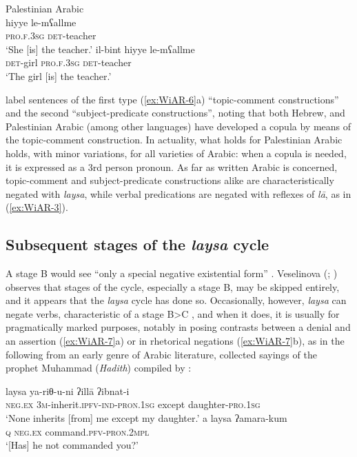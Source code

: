 \documentclass[output=paper,colorlinks,citecolor=brown]{langscibook}
\begin{document}
\ea Palestinian Arabic \citep[431]{li1977a}\label{ex:WiAR-6}\\
  \ea
  	\gll hiyye le-mʕallme\\
  	\textsc{pro.f.3sg} \textsc{det}-teacher\\
  	\glt‘She [is] the teacher.’
  \ex
  	\gll il-bint hiyye le-mʕallme\\
  	\textsc{det}-girl \textsc{pro.f.3sg} \textsc{det}-teacher\\
  	\glt ‘The girl [is] the teacher.’
\z \z

\citet[420]{li1977a} label sentences of the first type (\ref{ex:WiAR-6}a) “topic-comment constructions” and the second “subject-predicate constructions”, noting that both Hebrew, and Palestinian Arabic (among other languages) have developed a copula by means of the topic-comment construction. In actuality, what holds for Palestinian Arabic holds, with minor variations, for all varieties of Arabic: when a copula is needed, it is expressed as a 3rd person pronoun. As far as written Arabic is concerned, topic-comment and subject-predicate constructions alike are characteristically negated with \textit{laysa}, while verbal predications are negated with reflexes of \textit{lā}, as in (\ref{ex:WiAR-3}). 

\subsection{Subsequent stages of the \textit{laysa} cycle} \label{s:WiAR-2.3}

A stage B would see “only a special negative existential form” \citep[9]{Croft1991}. Veselinova (\citeyear[1338]{Veselinova2014}; \citeyear[153]{Veselinova2016}) observes that stages of the cycle, especially a stage B, may be skipped entirely, and it appears that the \textit{laysa} cycle has done so. Occasionally, however, \textit{laysa} can negate verbs, characteristic of a stage B>C \citep[9--10]{Croft1991}, and when it does, it is usually for pragmatically marked purposes, notably in posing contrasts between a denial and an assertion (\ref{ex:WiAR-7}a) or in rhetorical negations (\ref{ex:WiAR-7}b), as in the following from an early genre of Arabic literature, collected sayings of the prophet Muhammad (\textit{Hadith}) compiled by \citet[d. 870]{al-bu2000a}:

\ea \label{ex:WiAR-7}
  \ea
  	\gll laysa ya-riθ-u-ni ʔillā ʔibnat-i\\
  	\textsc{neg.ex} \textsc{3m}-inherit.\textsc{ipfv-ind-pron.1sg} except daughter-\textsc{pro.1sg}\\
  	\glt ‘None inherits [from] me except my daughter.’ \citep[Vol. VIII p. 151]{al-bu2000a}
  \ex
  	\gll a laysa ʔamara-kum\\
  	\textsc{q} \textsc{neg.ex} command.\textsc{pfv-pron.2mpl}\\
  	\glt ‘[Has] he not commanded you?’ \citep[Vol. VI p. 864]{al-bu2000a}
\z \z
\end{document}

